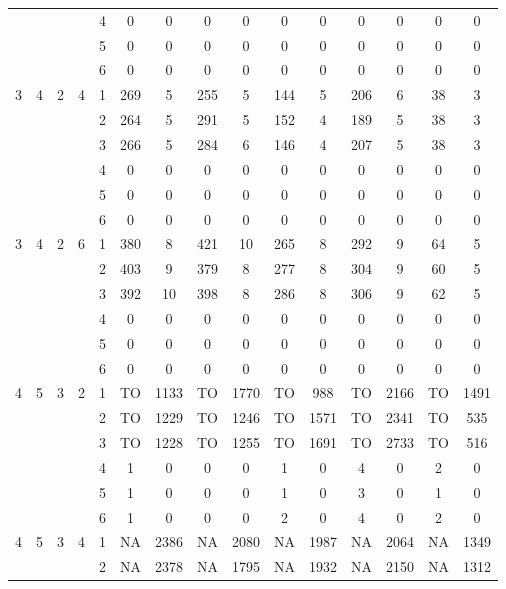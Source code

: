 \begin{longtable}{|c|c|c|c|c|c c|c c|c c|c c|c c|}
 & & & & 4 & 0 & 0 & 0 & 0 & 0 & 0 & 0 & 0 & 0 & 0 \\
 & & & & 5 & 0 & 0 & 0 & 0 & 0 & 0 & 0 & 0 & 0 & 0 \\
 & & & & 6 & 0 & 0 & 0 & 0 & 0 & 0 & 0 & 0 & 0 & 0 \\
\hline
\multirow{6}{*}{3} & \multirow{6}{*}{4} & \multirow{6}{*}{2} & \multirow{6}{*}{4} & 1 & 269 & 5 & 255 & 5 & 144 & 5 & 206 & 6 & 38 & 3 \\
 & & & & 2 & 264 & 5 & 291 & 5 & 152 & 4 & 189 & 5 & 38 & 3 \\
 & & & & 3 & 266 & 5 & 284 & 6 & 146 & 4 & 207 & 5 & 38 & 3 \\
 & & & & 4 & 0 & 0 & 0 & 0 & 0 & 0 & 0 & 0 & 0 & 0 \\
 & & & & 5 & 0 & 0 & 0 & 0 & 0 & 0 & 0 & 0 & 0 & 0 \\
 & & & & 6 & 0 & 0 & 0 & 0 & 0 & 0 & 0 & 0 & 0 & 0 \\
\hline
\multirow{6}{*}{3} & \multirow{6}{*}{4} & \multirow{6}{*}{2} & \multirow{6}{*}{6} & 1 & 380 & 8 & 421 & 10 & 265 & 8 & 292 & 9 & 64 & 5 \\
 & & & & 2 & 403 & 9 & 379 & 8 & 277 & 8 & 304 & 9 & 60 & 5 \\
 & & & & 3 & 392 & 10 & 398 & 8 & 286 & 8 & 306 & 9 & 62 & 5 \\
 & & & & 4 & 0 & 0 & 0 & 0 & 0 & 0 & 0 & 0 & 0 & 0 \\
 & & & & 5 & 0 & 0 & 0 & 0 & 0 & 0 & 0 & 0 & 0 & 0 \\
 & & & & 6 & 0 & 0 & 0 & 0 & 0 & 0 & 0 & 0 & 0 & 0 \\
\hline
\multirow{6}{*}{4} & \multirow{6}{*}{5} & \multirow{6}{*}{3} & \multirow{6}{*}{2} & 1 & TO & 1133 & TO & 1770 & TO & 988 & TO & 2166 & TO & 1491 \\
 & & & & 2 & TO & 1229 & TO & 1246 & TO & 1571 & TO & 2341 & TO & 535 \\
 & & & & 3 & TO & 1228 & TO & 1255 & TO & 1691 & TO & 2733 & TO & 516 \\
 & & & & 4 & 1 & 0 & 0 & 0 & 1 & 0 & 4 & 0 & 2 & 0 \\
 & & & & 5 & 1 & 0 & 0 & 0 & 1 & 0 & 3 & 0 & 1 & 0 \\
 & & & & 6 & 1 & 0 & 0 & 0 & 2 & 0 & 4 & 0 & 2 & 0 \\
\hline
\multirow{6}{*}{4} & \multirow{6}{*}{5} & \multirow{6}{*}{3} & \multirow{6}{*}{4} & 1 & NA & 2386 & NA & 2080 & NA & 1987 & NA & 2064 & NA & 1349 \\
 & & & & 2 & NA & 2378 & NA & 1795 & NA & 1932 & NA & 2150 & NA & 1312 \\

\end{longtable}
